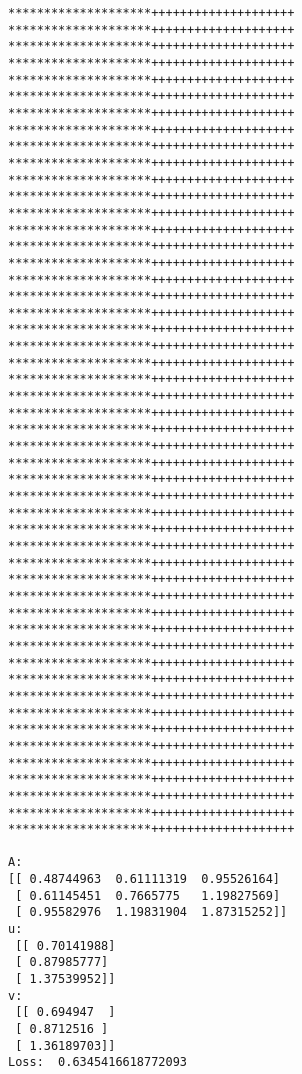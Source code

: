 \documentclass[11pt]{article}
\begin{document}
    \begin{Verbatim}[commandchars=\\\{\}]
********************++++++++++++++++++++
********************++++++++++++++++++++
********************++++++++++++++++++++
********************++++++++++++++++++++
********************++++++++++++++++++++
********************++++++++++++++++++++
********************++++++++++++++++++++
********************++++++++++++++++++++
********************++++++++++++++++++++
********************++++++++++++++++++++
********************++++++++++++++++++++
********************++++++++++++++++++++
********************++++++++++++++++++++
********************++++++++++++++++++++
********************++++++++++++++++++++
********************++++++++++++++++++++
********************++++++++++++++++++++
********************++++++++++++++++++++
********************++++++++++++++++++++
********************++++++++++++++++++++
********************++++++++++++++++++++
********************++++++++++++++++++++
********************++++++++++++++++++++
********************++++++++++++++++++++
********************++++++++++++++++++++
********************++++++++++++++++++++
********************++++++++++++++++++++
********************++++++++++++++++++++
********************++++++++++++++++++++
********************++++++++++++++++++++
********************++++++++++++++++++++
********************++++++++++++++++++++
********************++++++++++++++++++++
********************++++++++++++++++++++
********************++++++++++++++++++++
********************++++++++++++++++++++
********************++++++++++++++++++++
********************++++++++++++++++++++
********************++++++++++++++++++++
********************++++++++++++++++++++
********************++++++++++++++++++++
********************++++++++++++++++++++
********************++++++++++++++++++++
********************++++++++++++++++++++
********************++++++++++++++++++++
********************++++++++++++++++++++
********************++++++++++++++++++++
********************++++++++++++++++++++
********************++++++++++++++++++++
********************++++++++++++++++++++

A:
[[ 0.48744963  0.61111319  0.95526164]
 [ 0.61145451  0.7665775   1.19827569]
 [ 0.95582976  1.19831904  1.87315252]]
u:
 [[ 0.70141988]
 [ 0.87985777]
 [ 1.37539952]]
v:
 [[ 0.694947  ]
 [ 0.8712516 ]
 [ 1.36189703]]
Loss:  0.6345416618772093

    \end{Verbatim}
\end{document}
